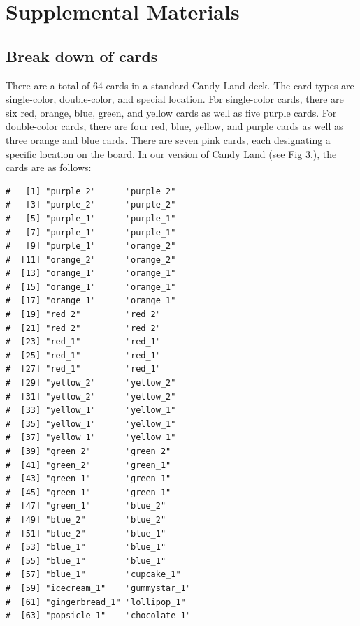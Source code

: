 \documentclass[letterpaper,9pt,twocolumn,twoside,]{pinp}
\begin{document}
\newpage

\hypertarget{supplemental-materials}{%
\section{Supplemental Materials}\label{supplemental-materials}}

\hypertarget{break-down-of-cards}{%
\subsection{Break down of cards}\label{break-down-of-cards}}

There are a total of 64 cards in a standard Candy Land deck. The card
types are single-color, double-color, and special location. For
single-color cards, there are six red, orange, blue, green, and yellow
cards as well as five purple cards. For double-color cards, there are
four red, blue, yellow, and purple cards as well as three orange and
blue cards. There are seven pink cards, each designating a specific
location on the board. In our version of Candy Land (see Fig 3.), the
cards are as follows:

\begin{Shaded}
\begin{Highlighting}[]
\NormalTok{(} \NormalTok{, } \NormalTok{)}
\end{Highlighting}
\end{Shaded}

\begin{ShadedResult}
\begin{verbatim}
#   [1] "purple_2"      "purple_2"     
#   [3] "purple_2"      "purple_2"     
#   [5] "purple_1"      "purple_1"     
#   [7] "purple_1"      "purple_1"     
#   [9] "purple_1"      "orange_2"     
#  [11] "orange_2"      "orange_2"     
#  [13] "orange_1"      "orange_1"     
#  [15] "orange_1"      "orange_1"     
#  [17] "orange_1"      "orange_1"     
#  [19] "red_2"         "red_2"        
#  [21] "red_2"         "red_2"        
#  [23] "red_1"         "red_1"        
#  [25] "red_1"         "red_1"        
#  [27] "red_1"         "red_1"        
#  [29] "yellow_2"      "yellow_2"     
#  [31] "yellow_2"      "yellow_2"     
#  [33] "yellow_1"      "yellow_1"     
#  [35] "yellow_1"      "yellow_1"     
#  [37] "yellow_1"      "yellow_1"     
#  [39] "green_2"       "green_2"      
#  [41] "green_2"       "green_1"      
#  [43] "green_1"       "green_1"      
#  [45] "green_1"       "green_1"      
#  [47] "green_1"       "blue_2"       
#  [49] "blue_2"        "blue_2"       
#  [51] "blue_2"        "blue_1"       
#  [53] "blue_1"        "blue_1"       
#  [55] "blue_1"        "blue_1"       
#  [57] "blue_1"        "cupcake_1"    
#  [59] "icecream_1"    "gummystar_1"  
#  [61] "gingerbread_1" "lollipop_1"   
#  [63] "popsicle_1"    "chocolate_1"
\end{verbatim}
\end{ShadedResult}
\end{document}
